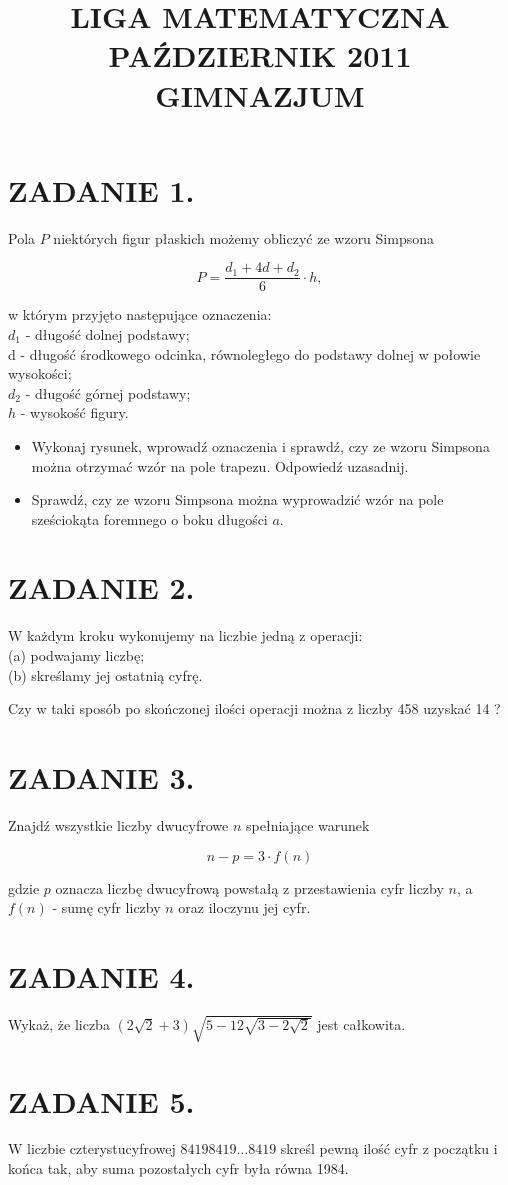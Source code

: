 \documentclass[10pt]{article}
\title{LIGA MATEMATYCZNA \\
 PAŹDZIERNIK 2011 \\
 GIMNAZJUM }
\author{}
\date{}
\begin{document}
\maketitle
\section*{ZADANIE 1.}
Pola \(P\) niektórych figur płaskich możemy obliczyć ze wzoru Simpsona

\[
P=\frac{d_{1}+4 d+d_{2}}{6} \cdot h,
\]

w którym przyjęto następujące oznaczenia:\\
\(d_{1}\) - długość dolnej podstawy;\\
d - długość środkowego odcinka, równoległego do podstawy dolnej w połowie wysokości;\\
\(d_{2}\) - długość górnej podstawy;\\
\(h\) - wysokość figury.

\begin{itemize}
  \item Wykonaj rysunek, wprowadź oznaczenia i sprawdź, czy ze wzoru Simpsona można otrzymać wzór na pole trapezu. Odpowiedź uzasadnij.
  \item Sprawdź, czy ze wzoru Simpsona można wyprowadzić wzór na pole sześciokąta foremnego o boku długości \(a\).
\end{itemize}

\section*{ZADANIE 2.}
W każdym kroku wykonujemy na liczbie jedną z operacji:\\
(a) podwajamy liczbę;\\
(b) skreślamy jej ostatnią cyfrę.

Czy w taki sposób po skończonej ilości operacji można z liczby 458 uzyskać 14 ?

\section*{ZADANIE 3.}
Znajdź wszystkie liczby dwucyfrowe \(n\) spełniające warunek

\[
n-p=3 \cdot f(n)
\]

gdzie \(p\) oznacza liczbę dwucyfrową powstałą z przestawienia cyfr liczby \(n\), a \(f(n)\) - sumę cyfr liczby \(n\) oraz iloczynu jej cyfr.

\section*{ZADANIE 4.}
Wykaż, że liczba \((2 \sqrt{2}+3) \sqrt{5-12 \sqrt{3-2 \sqrt{2}}}\) jest całkowita.

\section*{ZADANIE 5.}
W liczbie czterystucyfrowej \(84198419 \ldots 8419\) skreśl pewną ilość cyfr z początku i końca tak, aby suma pozostałych cyfr była równa 1984.
\end{document}
